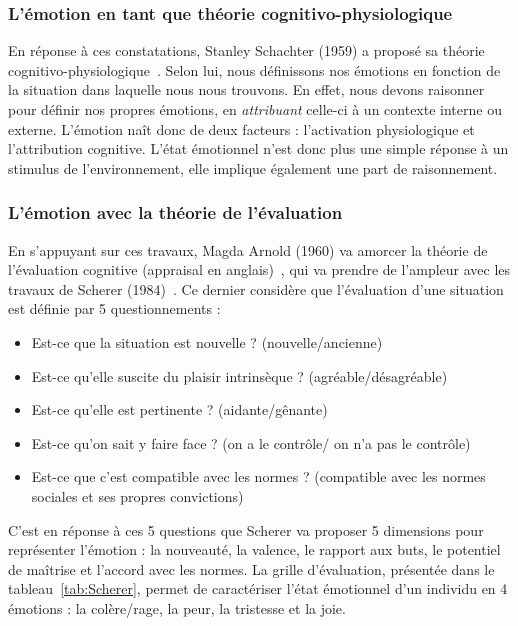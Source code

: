 \subsubsection{L'émotion en tant que théorie cognitivo-physiologique}
En réponse à ces constatations, Stanley Schachter (1959) a proposé sa théorie cognitivo-physiologique~\cite{Schachter1959,Schachter1962}. Selon lui, nous définissons nos émotions en fonction de la situation dans laquelle nous nous trouvons. En effet, nous devons raisonner pour définir nos propres émotions, en \textit{attribuant} celle-ci à un contexte interne ou externe. L'émotion naît donc de deux facteurs : l'activation physiologique et l'attribution cognitive. L'état émotionnel n'est donc plus une simple réponse à un stimulus de l'environnement, elle implique également une part de raisonnement.


\subsubsection{L'émotion avec la théorie de l'évaluation}
En s'appuyant sur ces travaux, Magda Arnold (1960) va amorcer la théorie de l'évaluation cognitive (appraisal en anglais)~\cite{Arnold1960}, qui va prendre de l'ampleur avec les travaux de Scherer (1984)~\cite{Scherer1984}. Ce dernier considère que l'évaluation d'une situation est définie par 5 questionnements :
\begin{itemize}
  \item Est-ce que la situation est nouvelle ? (nouvelle/ancienne)
  \item Est-ce qu'elle suscite du plaisir intrinsèque ? (agréable/désagréable)
  \item Est-ce qu'elle est pertinente ? (aidante/gênante)
  \item Est-ce qu'on sait y faire face ? (on a le contrôle/ on n'a pas le contrôle)
  \item Est-ce que c'est compatible avec les normes ? (compatible avec les normes sociales et ses propres convictions)
\end{itemize}

C'est en réponse à ces 5 questions que Scherer va proposer 5 dimensions pour représenter l'émotion : la nouveauté, la valence, le rapport aux buts, le potentiel de maîtrise et l'accord avec les normes. La grille d'évaluation, présentée dans le tableau~\ref{tab:Scherer}, permet de caractériser l'état émotionnel d'un individu en 4 émotions : la colère/rage, la peur, la tristesse et la joie.


